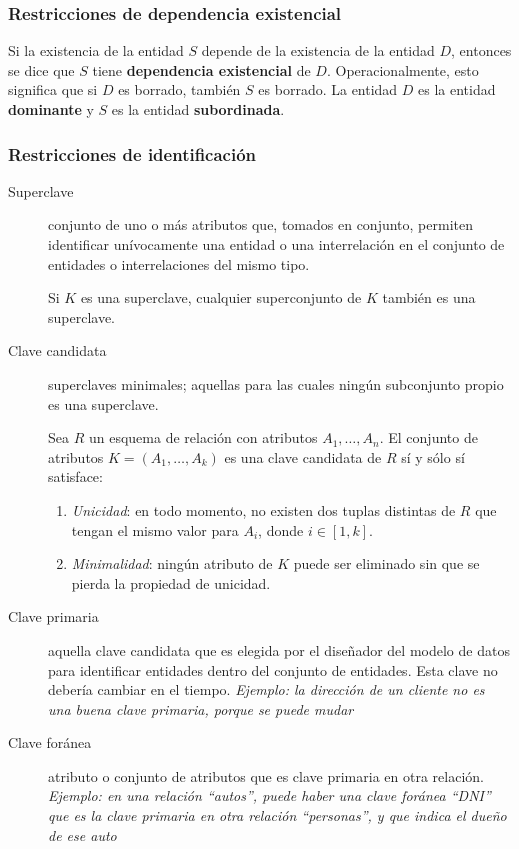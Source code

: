 \documentclass[a4paper, twoside]{article}
\begin{document}
\subsubsection{Restricciones de dependencia existencial}
Si la existencia de la entidad $S$ depende de la existencia de la entidad $D$, entonces se dice que $S$ tiene \textbf{dependencia existencial} de $D$. Operacionalmente, esto significa que si $D$ es borrado, también $S$ es borrado. La entidad $D$ es la entidad \textbf{dominante} y $S$ es la entidad \textbf{subordinada}.

\subsubsection{Restricciones de identificación}
\begin{description}
	\item[Superclave] conjunto de uno o más atributos que, tomados en conjunto, permiten identificar unívocamente una entidad o una interrelación en el conjunto de entidades o interrelaciones del mismo tipo.

	Si $K$ es una superclave, cualquier superconjunto de $K$ también es una superclave.

	\item[Clave candidata] superclaves minimales; aquellas para las cuales ningún subconjunto propio es una superclave.

	Sea $R$ un esquema de relación con atributos $A_{1},\dots,A_{n}$. El conjunto de atributos $K=\left(A_{1},\dots,A_{k}\right)$ es una clave candidata de $R$ sí y sólo sí satisface:
	\begin{enumerate}
		\item \emph{Unicidad}: en todo momento, no existen dos tuplas distintas de $R$ que tengan el mismo valor para $A_{i}$, donde $i\in[1,k]$.
		\item \emph{Minimalidad}: ningún atributo de $K$ puede ser eliminado sin que se pierda la propiedad de unicidad.
	\end{enumerate}

	\item[Clave primaria] aquella clave candidata que es elegida por el diseñador del modelo de datos para identificar entidades dentro del conjunto de entidades. Esta clave no debería cambiar en el tiempo. \emph{Ejemplo: la dirección de un cliente no es una buena clave primaria, porque se puede mudar}

	\item[Clave foránea] atributo o conjunto de atributos que es clave primaria en otra relación. \emph{Ejemplo: en una relación ``autos'', puede haber una clave foránea ``DNI'' que es la clave primaria en otra relación ``personas'', y que indica el dueño de ese auto}


\end{description}
\end{document}
